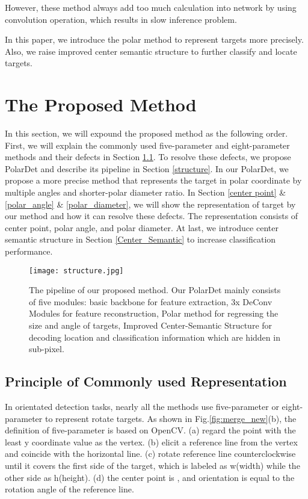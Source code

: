 \documentclass[10pt,twocolumn]{article}
\begin{document}
However, these method always add too much calculation into network by using convolution operation, which results in slow inference problem.

In this paper, we introduce the polar method to represent targets more precisely. Also, we raise improved center semantic structure to further classify and locate targets.

\section{The Proposed Method}\label{TPM}



In this section, we will expound the proposed method as the following order. First, we will explain the commonly used five-parameter and eight-parameter methods and their defects in Section \ref{PCR}. To resolve these defects, we propose PolarDet and describe its pipeline in Section \ref{structure}. In our PolarDet, we propose a more precise method that represents the target in polar coordinate by multiple angles and shorter-polar diameter ratio. In Section \ref{center point} \& \ref{polar_angle} \& \ref{polar_diameter}, we will show the representation of target by our method and how it can resolve these defects. The representation consists of center point, polar angle, and polar diameter. At last, we introduce center semantic structure in Section \ref{Center_Semantic} to increase classification performance.

\begin{figure}[!tb]	
	\centering
\texttt{[image: structure.jpg]}
	\caption{The pipeline of our proposed method. Our PolarDet mainly consists of five modules: basic backbone for feature extraction, 3x DeConv Modules for feature reconstruction, Polar method for regressing the size and angle of targets, Improved Center-Semantic Structure for decoding location and classification information which are hidden in sub-pixel.}
	\label{fig:structure}
\end{figure}

\subsection{Principle of Commonly used Representation}\label{PCR}

In orientated detection tasks, nearly all the methods use five-parameter or eight-parameter to represent rotate targets. As shown in Fig.\ref{fig:merge_new}(b), the definition of five-parameter is based on OpenCV. (a) regard the point with the least y coordinate value as the vertex. (b) elicit a reference line from the vertex and coincide with the horizontal line. (c) rotate reference line counterclockwise until it covers the first side of the target, which is labeled as w(width) while the other side as h(height). (d) the center point is , and orientation is equal to the rotation angle of the reference line.
\end{document}
